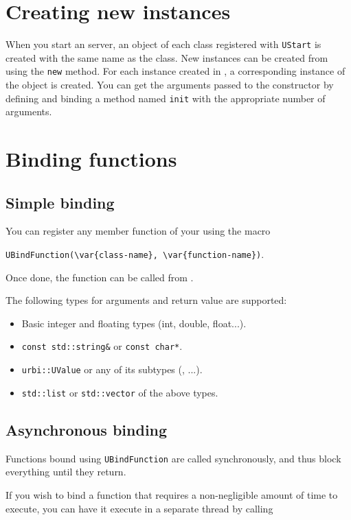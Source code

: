 \section{Creating new instances}

When you start an \urbi server, an object of each class registered
with \lstinline{UStart} is created with the same name as the
class. New instances can be created from \urbi using the
\lstinline|new| method. For each instance created in \urbi, a
corresponding instance of the \Cxx object is created. You can get the
arguments passed to the constructor by defining and binding a method
named \lstinline|init| with the appropriate number of arguments.

\section{Binding functions}

\subsection{Simple binding}

You can register any member function of your \UObject using the macro

\lstinline|UBindFunction(\var{class-name}, \var{function-name})|.

Once done, the function can be called from \us.

The following types for arguments and return value are supported:

\begin{itemize}
\item Basic integer and floating types (int, double, float...).
\item \lstinline{const std::string&} or \lstinline{const char*}.
\item \lstinline{urbi::UValue} or any of its subtypes (\UBinary, \UList...).
\item \lstinline{std::list} or \lstinline{std::vector} of the above types.
\end{itemize}

\subsection{Asynchronous binding}
Functions bound using \lstinline{UBindFunction} are called synchronously, and
thus block everything until they return.

If you wish to bind a function that requires a non-negligible amount of time
to execute, you can have it execute in a separate thread by calling

